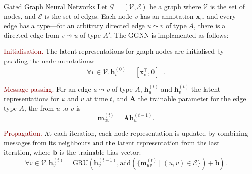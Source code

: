 \documentclass[final,hyperref={pdfpagelabels=false}]{beamer}
\begin{document}
\begin{frame}[t]
\begin{columns}[t]
\begin{column}{.3\textwidth}
      
      
    
     \vspace{-0.6in} 
    \begin{block}{Gated Graph Neural Networks}
    Let $\mathcal{G}=(\mathcal{V}, \mathcal{E})$ be a graph where $\mathcal{V}$ is the set of nodes, and $\mathcal{E}$ is the set of edges. Each node $v$ has an annotation $\mathbf{x}_v$, and every edge has a type—for an arbitrary directed edge $u \leadsto v$ of type $A$, there is a directed edge from $v \leadsto u$ of type $A'$. The GGNN is implemented as follows:
    \vspace{0.2in}
    
    \textcolor{darkred}{Initialisation.} The latent representations for graph nodes are initialised by padding the node annotations:
    \begin{equation}
        \forall v \in \mathcal{V}. \, \mathbf{h}_v^{(0)} = [\mathbf{x}_v^\top, \mathbf{0}]^\top.
    \end{equation}
    
    
    \textcolor{darkred}{Message passing.} For an edge $u \leadsto v$ of type $A$, $\mathbf{h}_u^{(t)}$ and $\mathbf{h}_v^{(t)}$ the latent representations for $u$ and $v$ at time $t$, and $\mathbf{A}$ the trainable parameter for the edge type $A$, the from $u$ to $v$ is
    \begin{equation}
        \mathbf{m}_{uv}^{(t)} = \mathbf{A} \mathbf{h}_u^{(t-1)}.
    \end{equation}
    
    \textcolor{darkred}{Propagation.} At each iteration, each node representation is updated by combining messages from its neighbours and the latent representation from the last iteration, where $\mathbf{b}$ is the trainable bias vector:
    \begin{equation}
        \forall v \in \mathcal{V}. \, \mathbf{h}_v^{(t)} = \mathrm{GRU}\left(\mathbf{h}_v^{(t-1)}, 
        \mathrm{add}(\{\mathbf{m}_{uv}^{(t)} \mid (u, v) \in \mathcal{E} \}) + \mathbf{b}\right).
    \end{equation}


\end{block}
\end{column}
\end{columns}
\end{frame}
\end{document}
